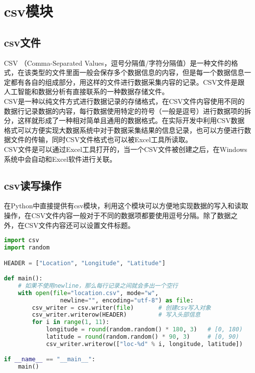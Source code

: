 \newpage

\section{csv模块}

\subsection{csv文件}

CSV （Comma-Separated Values，逗号分隔值/字符分隔值）是一种文件的格式，在该类型的文件里面一般会保存多个数据信息的内容，但是每一个数据信息一定都有各自的组成部分，用这样的文件进行数据采集内容的记录。CSV文件是跟人工智能和数据分析有直接联系的一种数据存储文件。\\

CSV是一种以纯文件方式进行数据记录的存储格式，在CSV文件内容使用不同的数据行记录数据的内容，每行数据使用特定的符号（一般是逗号）进行数据项的拆分，这样就形成了一种相对简单且通用的数据格式。在实际开发中利用CSV数据格式可以方便实现大数据系统中对于数据采集结果的信息记录，也可以方便进行数据文件的传输，同时CSV文件格式也可以被Excel工具所读取。\\

CSV文件是可以通过Excel工具打开的，当一个CSV文件被创建之后，在Windows系统中会自动和Excel软件进行关联。\\

\subsection{csv读写操作}

在Python中直接提供有csv模块，利用这个模块可以方便地实现数据的写入和读取操作，在CSV文件内容一般对于不同的数据项都要使用逗号分隔。除了数据之外，在CSV文件内容还可以设置文件标题。\\


\begin{lstlisting}[language=Python]
import csv
import random

HEADER = ["Location", "Longitude", "Latitude"]

def main():
    # 如果不使用newline，那么每行记录之间就会多出一个空行
    with open(file="location.csv", mode="w", 
                newline="", encoding="utf-8") as file:
        csv_writer = csv.writer(file)       # 创建csv写入对象
        csv_writer.writerow(HEADER)         # 写入头部信息
        for i in range(1, 11):
            longitude = round(random.random() * 180, 3)   # [0, 180)
            latitude = round(random.random() * 90, 3)     # [0, 90)
            csv_writer.writerow(["loc-%d" % i, longitude, latitude])

if __name__ == "__main__":
    main()
\end{lstlisting}

